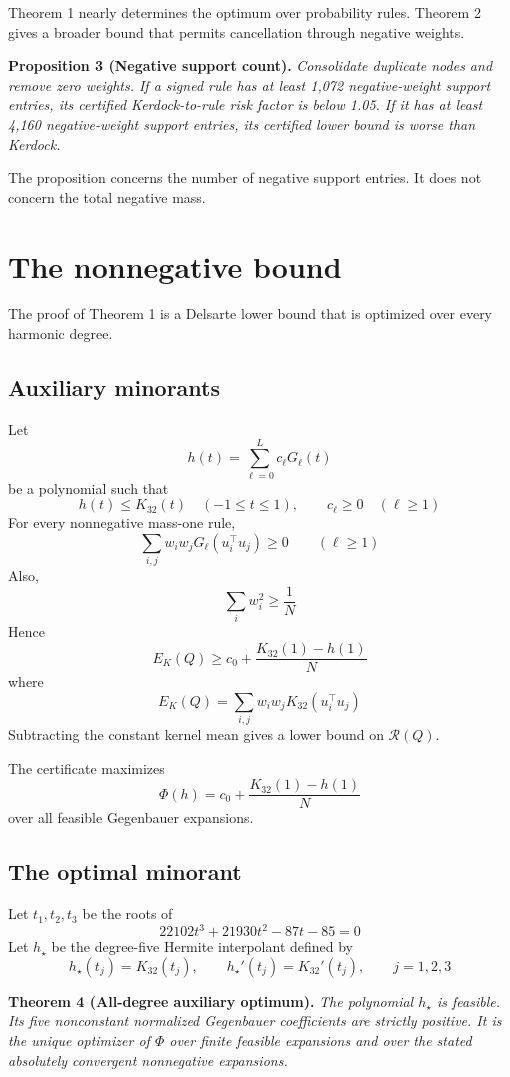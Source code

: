\documentclass[11pt]{article}
\begin{document}
Theorem 1 nearly determines the optimum over probability rules. Theorem
2 gives a broader bound that permits cancellation through negative
weights.

\textbf{Proposition 3 (Negative support count).} \emph{Consolidate
duplicate nodes and remove zero weights. If a signed rule has at least
1,072 negative-weight support entries, its certified Kerdock-to-rule
risk factor is below 1.05. If it has at least 4,160 negative-weight
support entries, its certified lower bound is worse than Kerdock.}

The proposition concerns the number of negative support entries. It does
not concern the total negative mass.

\section{The nonnegative bound}\label{the-nonnegative-bound}

The proof of Theorem 1 is a Delsarte lower bound that is optimized over
every harmonic degree.

\subsection{Auxiliary minorants}\label{auxiliary-minorants}

Let \[
h(t)=\sum_{\ell=0}^{L}c_\ell G_\ell(t)
\] be a polynomial such that \[
h(t)\leq K_{32}(t) \quad (-1\leq t\leq1),
\qquad
c_\ell\geq0 \quad (\ell\geq1)
\] For every nonnegative mass-one rule, \[
\sum_{i,j}w_iw_jG_\ell(u_i^\top u_j)\geq0
\qquad (\ell\geq1)
\] Also, \[
\sum_i w_i^2\geq\frac1N
\] Hence \[
E_K(Q)
\geq c_0+\frac{K_{32}(1)-h(1)}{N}
\] where \[
E_K(Q)=\sum_{i,j}w_iw_jK_{32}(u_i^\top u_j)
\] Subtracting the constant kernel mean gives a lower bound on
\(\mathcal{R}(Q)\).

The certificate maximizes \[
\Phi(h)=c_0+\frac{K_{32}(1)-h(1)}{N}
\] over all feasible Gegenbauer expansions.

\subsection{The optimal minorant}\label{the-optimal-minorant}

Let \(t_1,t_2,t_3\) be the roots of \[
22102t^3+21930t^2-87t-85=0
\] Let \(h_\star\) be the degree-five Hermite interpolant defined by \[
h_\star(t_j)=K_{32}(t_j),
\qquad
h_\star'(t_j)=K_{32}'(t_j),
\qquad j=1,2,3
\]

\textbf{Theorem 4 (All-degree auxiliary optimum).} \emph{The polynomial
\(h_\star\) is feasible. Its five nonconstant normalized Gegenbauer
coefficients are strictly positive. It is the unique optimizer of
\(\Phi\) over finite feasible expansions and over the stated absolutely
convergent nonnegative expansions.}
\end{document}
